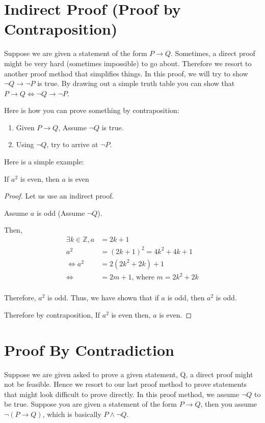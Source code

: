 \section{Indirect Proof (Proof by Contraposition)}
Suppose we are given a statement of the form $P \rightarrow Q$. Sometimes, a
direct proof might be very hard (sometimes impossible) to go about. Therefore
we resort to another proof method that simplifies things. In this proof, we
will try to show $\neg Q \rightarrow \neg P$ is true. By drawing out a simple
truth table you can show that $ P \rightarrow Q \Leftrightarrow \neg Q
\rightarrow \neg P$.

Here is how you can prove something by contraposition:

\begin{enumerate}[label=\textbf{Step \arabic*},leftmargin=*]
    \item Given $P \rightarrow Q$, Assume $\neg Q$ is true.
    \item Using $\neg Q$, try to arrive at $\neg P$.
\end{enumerate}

\noindent Here is a simple example:

\begin{theorem}
    If $a^{2}$ is even, then $a$ is even
\end{theorem}

\begin{proof}
    Let us use an indirect proof.

    Assume $a$ is odd (Assume $\neg Q$).

    Then,
    \[
        \begin{split}
            \exists k \in \mathbb{Z}, a &= 2k + 1 \\
            a^{2} &= (2k + 1)^{2} = 4k^2 + 4k + 1 \\
            \Leftrightarrow a^{2} &= 2(2k^{2} + 2k) + 1 \\
            \Leftrightarrow &= 2m + 1 \text{, where } m = 2k^{2} + 2k \\
        \end{split}
    \]

    Therefore, $a^{2}$ is odd.  Thus, we have shown that if $a$ is odd, then
    $a^{2}$ is odd.

    Therefore by contraposition, If $a^{2}$ is even then, $a$ is even.
\end{proof}

\section{Proof By Contradiction}
Suppose we are given asked to prove a given statement, Q, a direct proof might
not be feasible. Hence we resort to our last proof method to prove statements
that might look difficult to prove directly. In this proof method, we assume
$\neg Q$ to be true. Suppose you are given a statement of the form $P
\rightarrow Q$, then you assume $\neg (P \rightarrow Q)$, which is basically $P
\wedge \neg Q$.


